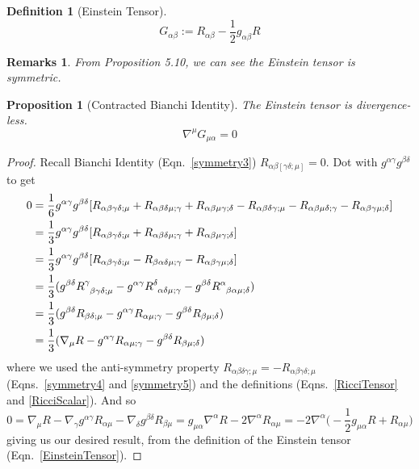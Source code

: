 \documentclass[a4paper]{article}
\newtheorem{remarks}{Remarks}[section]
\theoremstyle{new}
\newtheorem{defi}{Definition}[section]
\newtheorem{prop}{Proposition}[section]
\begin{document}
\begin{defi}[Einstein Tensor]
\begin{equation}
G_{\alpha\beta}:=R_{\alpha\beta}-\frac{1}{2}g_{\alpha\beta}R\label{EinsteinTensor}
\end{equation}
\end{defi}
\begin{remarks}
From Proposition 5.10, we can see the Einstein tensor is symmetric.
\end{remarks}
\begin{prop}[Contracted Bianchi Identity]
The Einstein tensor is divergence-less.
\begin{equation}
\nabla^\mu G_{\mu\alpha}=0\label{contractedBianchi}
\end{equation}
\end{prop}
\begin{proof}
Recall Bianchi Identity (Eqn.~\ref{symmetry3}) $R_{\alpha\beta[\gamma\delta;\mu]}=0$. Dot with $g^{\alpha\gamma}g^{\beta\delta}$ to get
\begin{align}
    0&=\frac{1}{6}g^{\alpha\gamma}g^{\beta\delta}[R_{\alpha\beta\gamma\delta;\mu}+R_{\alpha\beta\delta\mu;\gamma}+R_{\alpha\beta\mu\gamma;\delta}-R_{\alpha\beta\delta\gamma;\mu}-R_{\alpha\beta\mu\delta;\gamma}-R_{\alpha\beta\gamma\mu;\delta}]\nonumber\\&=\frac{1}{3}g^{\alpha\gamma}g^{\beta\delta}[R_{\alpha\beta\gamma\delta;\mu}+R_{\alpha\beta\delta\mu;\gamma}+R_{\alpha\beta\mu\gamma;\delta}]\nonumber\\&=\frac{1}{3}g^{\alpha\gamma}g^{\beta\delta}[R_{\alpha\beta\gamma\delta;\mu}-R_{\beta\alpha\delta\mu;\gamma}-R_{\alpha\beta\gamma\mu;\delta}]\nonumber\\&=\frac{1}{3}(g^{\beta\delta}\tensor*{R}{*_{}^{\gamma}_{\beta\gamma\delta;\mu}}-g^{\alpha\gamma}\tensor*{R}{*_{}^{\delta}_{\alpha\delta\mu;\gamma}}-g^{\beta\delta}\tensor*{R}{*_{}^{\alpha}_{\beta\alpha\mu;\delta}})\nonumber\\&=\frac{1}{3}(g^{\beta\delta}R_{\beta\delta;\mu}-g^{\alpha\gamma}R_{\alpha\mu;\gamma}-g^{\beta\delta}R_{\beta\mu;\delta})\nonumber\\&=\frac{1}{3}(\nabla_\mu R-g^{\alpha\gamma}R_{\alpha\mu;\gamma}-g^{\beta\delta}R_{\beta\mu;\delta})\nonumber
\end{align}
where we used the anti-symmetry property $R_{\alpha\beta\delta\gamma;\mu}=-R_{\alpha\beta\gamma\delta;\mu}$ (Eqns.~\ref{symmetry4} and \ref{symmetry5}) and the definitions (Eqns.~\ref{RicciTensor} and \ref{RicciScalar}). And so
$$0=\nabla_\mu R-\nabla_\gamma g^{\alpha\gamma}R_{\alpha\mu}-\nabla_\delta g^{\beta\delta}R_{\beta\mu}=g_{\mu\alpha}\nabla^\alpha R-2\nabla^\alpha R_{\alpha\mu}=-2\nabla^\alpha\bigg(-\frac{1}{2}g_{\mu\alpha}R+R_{\alpha\mu}\bigg)$$
giving us our desired result, from the definition of the Einstein tensor (Eqn.~\ref{EinsteinTensor}).
\end{proof}
\end{document}
